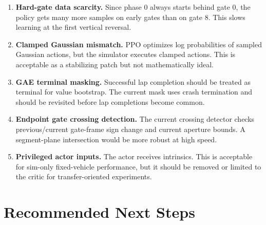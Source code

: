 \documentclass[11pt]{article}
\begin{document}
\begin{enumerate}
  \item \textbf{Hard-gate data scarcity.} Since phase 0 always starts behind
  gate 0, the policy gets many more samples on early gates than on gate 8. This
  slows learning at the first vertical reversal.

  \item \textbf{Clamped Gaussian mismatch.} PPO optimizes log probabilities of
  sampled Gaussian actions, but the simulator executes clamped actions. This is
  acceptable as a stabilizing patch but not mathematically ideal.

  \item \textbf{GAE terminal masking.} Successful lap completion should be
  treated as terminal for value bootstrap. The current mask uses crash
  termination and should be revisited before lap completions become common.

  \item \textbf{Endpoint gate crossing detection.} The current crossing detector
  checks previous/current gate-frame sign change and current aperture bounds. A
  segment-plane intersection would be more robust at high speed.

  \item \textbf{Privileged actor inputs.} The actor receives intrinsics. This is
  acceptable for sim-only fixed-vehicle performance, but it should be removed or
  limited to the critic for transfer-oriented experiments.
\end{enumerate}

\section{Recommended Next Steps}
\end{document}
